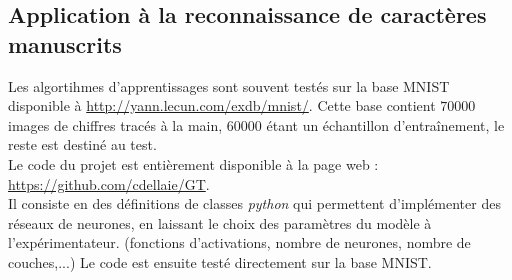 \documentclass{article}
\theoremstyle{definition}
\newcommand{\Z}{\mathbb Z}
\newcommand{\R}{\mathbb R}
\begin{document}
\subsection{Application à la reconnaissance de caractères manuscrits}

Les algortihmes d'apprentissages sont souvent testés sur la base MNIST disponible à \url{http://yann.lecun.com/exdb/mnist/}. Cette base contient $70 000$ images de chiffres tracés à la main, $60 000$ étant un échantillon d'entraînement, le reste est destiné au test. \\

Le code du projet est entièrement disponible à la page web : \url{https://github.com/cdellaie/GT}.\\

Il consiste en des définitions de classes \textit{python} qui permettent d'implémenter des réseaux de neurones, en laissant le choix des paramètres du modèle à l'expérimentateur. (fonctions d'activations, nombre de neurones, nombre de couches,...) Le code est ensuite testé directement sur la base MNIST.


\end{document}
